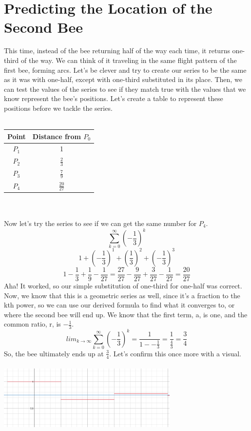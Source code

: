 \documentclass[a4paper,openright, 14pt]{article}
\begin{document}
\section*{Predicting the Location of the Second Bee}
This time, instead of the bee returning half of the way each time, it returns one-third of the way. We can think of it traveling in the same flight pattern of the first bee, forming arcs. Let's be clever and try to create our series to be the same as it was with one-half, except with one-third substituted in its place. Then, we can test the values of the series to see if they match true with the values that we know represent the bee's positions. Let's create a table to represent these positions before we tackle the series.
\\\\
\begin{tabular}{c|c}
Point & Distance from $P_0$\\
    \hline
    $P_1$ & 1 \\
    \hline
    $P_2$ & $\frac{2}{3}$ \\
    \hline
    $P_3$ & $\frac{7}{9}$ \\
    \hline
    $P_4$ & $\frac{20}{27}$
\end{tabular}
\\\\
Now let's try the series to see if we can get the same number for $P_4$. 
$$\sum\limits_{k=0}^{\infty} (-\frac{1}{3})^k$$
$$1+(-\frac{1}{3})^1+(\frac{1}{3})^2+(-\frac{1}{3})^3$$
$$1-\frac{1}{3}+\frac{1}{9}-\frac{1}{27}=\frac{27}{27}-\frac{9}{27}+\frac{3}{27}-\frac{1}{27}=\frac{20}{27}$$
Aha! It worked, so our simple substitution of one-third for one-half was correct. Now, we know that this is a geometric series as well, since it's a fraction to the kth power, so we can use our derived formula to find what it converges to, or where the second bee will end up. We know that the first term, a, is one, and the common ratio, r, is $-\frac{1}{3}$.
$$lim_{k\to\infty}\sum\limits_{k=0}^{\infty} (-\frac{1}{3})^k=\frac{1}{1--\frac{1}{3}}=\frac{1}{\frac{4}{3}}=\frac{3}{4}$$
So, the bee ultimately ends up at $\frac{3}{4}$. Let's confirm this once more with a visual.
\begin{center}
    \includegraphics[width=9cm, height=3.5cm]{Images/line2.png}
\end{center}
\end{document}
